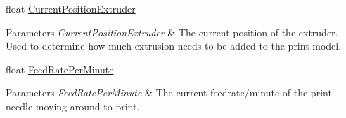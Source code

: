 \begin{DoxyCompactItemize}
\begin{DoxyCompactList}
\end{DoxyCompactList}\item 
\mbox{\label{class_printer_a22940854321293b4b1002955036877b1}} 
float \hyperlink{class_printer_a22940854321293b4b1002955036877b1}{Current\+Position\+Extruder}
\begin{DoxyCompactList}\small\item\em 
\begin{DoxyParams}{Parameters}
{\em Current\+Position\+Extruder} & The current position of the extruder. Used to determine how much extrusion needs to be added to the print model.\\
\hline
\end{DoxyParams}
\end{DoxyCompactList}\item 
\mbox{\label{class_printer_a5e795efeadb770ca6d578abb6c673ec3}} 
float \hyperlink{class_printer_a5e795efeadb770ca6d578abb6c673ec3}{Feed\+Rate\+Per\+Minute}
\begin{DoxyCompactList}\small\item\em 
\begin{DoxyParams}{Parameters}
{\em Feed\+Rate\+Per\+Minute} & The current feedrate/minute of the print needle moving around to print.\\
\hline
\end{DoxyParams}
\end{DoxyCompactList}\end{DoxyCompactItemize}
